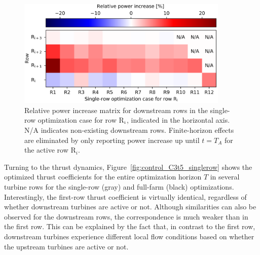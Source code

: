 	\begin{figure}
		\centering
		\includegraphics[width=0.9\textwidth]{chapters/analysis_induction_control/individual_gains.eps}
		\caption{Relative power increase matrix for downstream rows in the single-row optimization case for row R$_{\rm i}$, indicated in the horizontal axis. N/A indicates non-existing downstream rows. Finite-horizon effects are eliminated by only reporting power increase up until $t = T_A$ for the active row R$_i$. \label{fig:gains_singlerow}}
	\end{figure}

	Turning to the thrust dynamics, Figure~\ref{fig:control_C3t5_singlerow} shows the optimized thrust coefficients for the entire optimization horizon $T$ in several turbine rows for the single-row (gray) and full-farm (black) optimizations. Interestingly, the first-row thrust coefficient is virtually identical, regardless of whether downstream turbines are active or not. Although similarities can also be observed for the downstream rows, the correspondence is much weaker than in the first row. This can be explained by the fact that, in contrast to the first row, downstream turbines experience different local flow conditions based on whether the upstream turbines are active or not.
	
